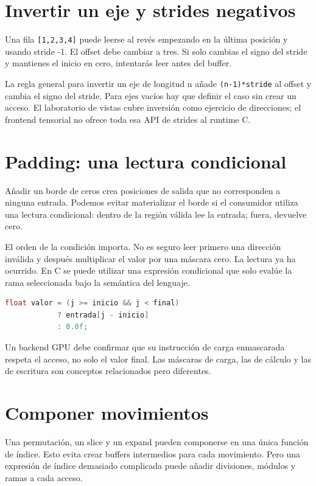 \documentclass[12pt,a4paper,oneside]{report}
\begin{document}
\section{Invertir un eje y strides negativos}
Una fila \texttt{[1,2,3,4]} puede leerse al revés empezando en la última posición y usando stride -1. El offset debe cambiar a tres. Si solo cambias el signo del stride y mantienes el inicio en cero, intentarás leer antes del buffer.

La regla general para invertir un eje de longitud n añade \texttt{(n-1)*stride} al offset y cambia el signo del stride. Para ejes vacíos hay que definir el caso sin crear un acceso. El laboratorio de vistas cubre inversión como ejercicio de direcciones; el frontend tensorial no ofrece toda esa API de strides al runtime C.

\section{Padding: una lectura condicional}
Añadir un borde de ceros crea posiciones de salida que no corresponden a ninguna entrada. Podemos evitar materializar el borde si el consumidor utiliza una lectura condicional: dentro de la región válida lee la entrada; fuera, devuelve cero.

El orden de la condición importa. No es seguro leer primero una dirección inválida y después multiplicar el valor por una máscara cero. La lectura ya ha ocurrido. En C se puede utilizar una expresión condicional que solo evalúe la rama seleccionada bajo la semántica del lenguaje.

\begin{lstlisting}[language=C]
float valor = (j >= inicio && j < final)
            ? entrada[j - inicio]
            : 0.0f;
\end{lstlisting}
Un backend GPU debe confirmar que su instrucción de carga enmascarada respeta el acceso, no solo el valor final. Las máscaras de carga, las de cálculo y las de escritura son conceptos relacionados pero diferentes.

\section{Componer movimientos}
Una permutación, un slice y un expand pueden componerse en una única función de índice. Esto evita crear buffers intermedios para cada movimiento. Pero una expresión de índice demasiado complicada puede añadir divisiones, módulos y ramas a cada acceso.
\end{document}

